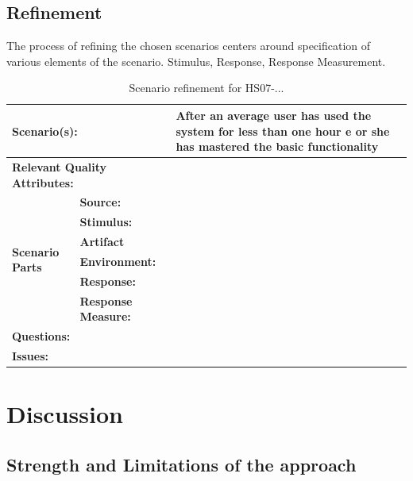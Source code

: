 \documentclass[a4paper,10pt]{article}
\begin{document}
\subsection{Refinement}
The process of refining the chosen scenarios centers around specification of various elements of the scenario. Stimulus, Response, Response Measurement. 
\begin{table}[!htp]
\begin{center}
\begin{tabular}{|p{0.3cm}|p{2.5cm}|p{8cm}|}
  \hline
  \multicolumn{2}{|p{3cm}|}{\bfseries Scenario(s):} & After an average user has used the system for less than one hour e or she has mastered the basic functionality \\
  \hline
  \multicolumn{2}{|p{3cm}|}{\bfseries Relevant Quality Attributes:} usability & \\
  \hline
  \multirow{6}{*}{\begin{sideways}{\bfseries Scenario Parts}\end{sideways}}
  & {\bfseries Source:} &  \\
  \cline{2-3}
  & {\bfseries Stimulus:} &  \\
  \cline{2-3}
  & {\bfseries Artifact} &  \\
  \cline{2-3}
  & {\bfseries Environment:} &  \\
  \cline{2-3}
  & {\bfseries Response:} &  \\
  \cline{2-3}
  & {\bfseries Response Measure:} & \\
  \hline
  \multicolumn{2}{|p{3cm}|}{\bfseries Questions:} &  \\
  \hline
  \multicolumn{2}{|p{3cm}|}{\bfseries Issues:} &  \\
  \hline
\end{tabular}
\caption{Scenario refinement for HS07-...}
\end{center}
\end{table}

\section{Discussion}
\subsection{Strength and Limitations of the approach}
\end{document}
